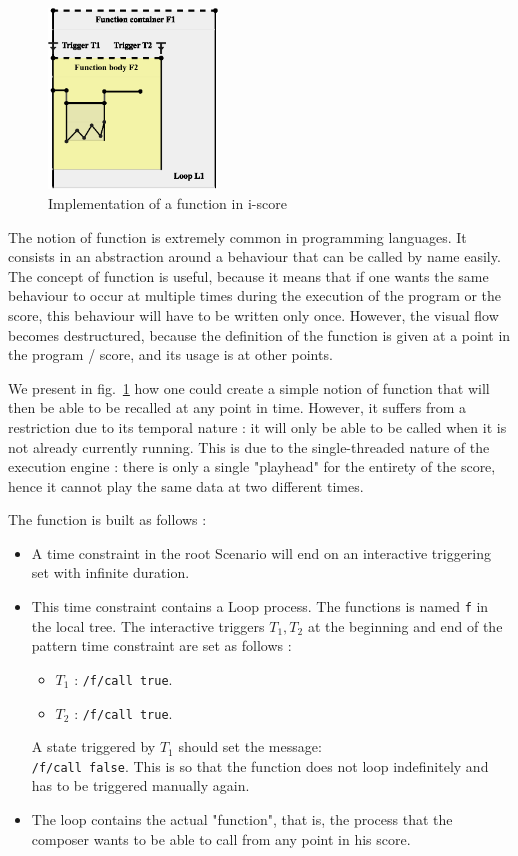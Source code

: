 \documentclass{article}
\begin{document}
\begin{figure}
\centering
\includegraphics[width=0.40\textwidth]{images/function.eps}
\caption{Implementation of a function in i-score}
\label{fig.function}
\end{figure}

The notion of function is extremely common in programming languages.
It consists in an abstraction around a behaviour that can be called 
by name easily.
The concept of function is useful, because it means that 
if one wants the same behaviour to occur at multiple times during
the execution of the program or the score, this behaviour will 
have to be written only once.
However, the visual flow becomes destructured, because 
the definition of the function is given at a point in the program / score, 
and its usage is at other points.

We present in fig.~\ref{fig.function} how one could create a simple 
notion of function that will then be able to be recalled at any point in time.
However, it suffers from a restriction due to its temporal nature : 
it will only be able to be called when it is not already currently running. 
This is due to the single-threaded nature of the execution engine : there is 
only a single "playhead" for the entirety of the score, hence it cannot play the 
same data at two different times.

The function is built as follows : 
\begin{itemize}
    \item A time constraint in the root Scenario will end on an interactive triggering set with infinite duration.
    \item This time constraint contains a Loop process. 
    The functions is named \lstinline{f} in the local tree. The interactive triggers $T_1, T_2$ at the beginning and end of the pattern time constraint are set as follows : 
    \begin{itemize}
        \item $T_1$ : \lstinline{/f/call true}.
        \item $T_2$ : \lstinline{/f/call true}.
    \end{itemize}
    A state triggered by $T_1$ should set the message:~\\
    \lstinline{/f/call false}. This is so that the function does not loop 
    indefinitely and has to be triggered manually again.
    \item The loop contains the actual "function", that is, the process that the composer wants to be able to call from any point in his score. 
\end{itemize}
\end{document}
